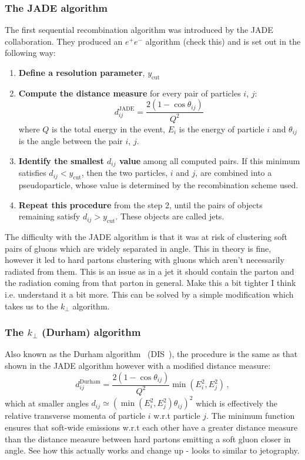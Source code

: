 \subsubsection{The JADE algorithm}
The first sequential recombination algorithm was introduced by the JADE collaboration. They produced an $e^+e^-$ algorithm {\color{blue} (check this)} and is set out in the following way:
\begin{enumerate}
    \item {\textbf{Define a resolution parameter}}, $y_{\mathrm{cut}}$
    \item {\textbf{Compute the distance measure}} for every pair of particles $i$, $j$:
        \begin{equation}
        \label{eq:yij-jade}
    	d^{\mathrm{JADE}}_{ij}=\frac{2(1-\cos\theta_{ij})}{Q^2}\,
    \end{equation}
    where $Q$ is the total energy in the event, $E_i$ is the energy of particle $i$ and $\theta_{ij}$ is the angle between the pair $i$, $j$. 
      \item {\textbf{Identify the smallest $d_{ij}$ value}} among all computed pairs. If this minimum satisfies $d_{ij}<y_{\mathrm{cut}}$, then the two particles, $i$ and $j$, are combined into a pseudoparticle, whose value is determined by the recombination scheme used.
    \item {\textbf{Repeat this procedure}} from the step 2, until the pairs of objects remaining satisfy $d_{ij}>y_{\mathrm{cut}}$. These objects are called jets. 
\end{enumerate}
The difficulty with the JADE algorithm is that it was at risk of clustering soft pairs of gluons which are widely separated in angle. This in theory is fine, however it led to hard partons clustering with gluons which aren't necessarily radiated from them. This is an issue as in a jet it should contain the parton and the radiation coming from that parton in general. {\color{blue} Make this a bit tighter I think i.e. understand it a bit more.} This can be solved by a simple modification which takes us to the $k_\perp$ algorithm.  


\subsubsection{ The $k_\perp$ (Durham) algorithm}
Also known as the Durham algorithm~\cite{Catani:1991hj} (DIS~\cite{Catani:1992zp}), the procedure is the same as that shown in the JADE algorithm however with a modified distance measure:
\begin{equation}
	 \label{eq:yij-De}
    	d^{\mathrm{Durham}}_{ij}=\frac{2(1-\cos\theta_{ij})}{Q^2}\min(E_i^2,E_j^2)\,,
\end{equation} 
which at smaller angles $d_{ij}\simeq(\min(E_i^2,E_j^2)\theta_{ij})^2$ which is effectively the relative transverse momenta of particle $i$ w.r.t particle $j$. The minimum function ensures that soft-wide emissions w.r.t each other have a greater distance measure than the distance measure between hard partons emitting a soft gluon closer in angle. {\color{green} See how this actually works and change up - looks to similar to jetography.} 

